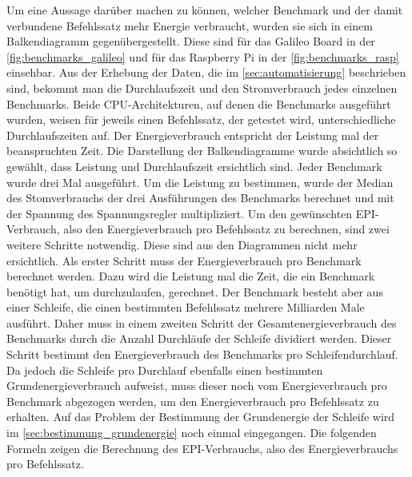 Um eine Aussage darüber machen zu können, welcher Benchmark und der damit verbundene Befehlssatz mehr Energie verbraucht, wurden sie sich in einem Balkendiagramm gegenübergestellt. Diese sind für das Galileo Board in der \autoref{fig:benchmarks_galileo} und für das Raspberry Pi in der \autoref{fig:benchmarks_rasp} einsehbar. Aus der Erhebung der Daten, die im \autoref{sec:automatisierung} beschrieben sind, bekommt man die Durchlaufszeit und den Stromverbrauch jedes einzelnen Benchmarks. Beide CPU-Architekturen, auf denen die Benchmarks ausgeführt wurden, weisen für jeweils einen Befehlssatz, der getestet wird, unterschiedliche Durchlaufszeiten auf. Der Energieverbrauch entspricht der Leistung mal der beanspruchten Zeit. Die Darstellung der Balkendiagramme wurde absichtlich so gewählt, dass Leistung und Durchlaufszeit ersichtlich sind. Jeder Benchmark wurde drei Mal ausgeführt. Um die Leistung zu bestimmen, wurde der Median des Stomverbrauchs der drei Ausführungen des Benchmarks berechnet und mit der Spannung des Spannungsregler multipliziert. Um den gewünschten EPI-Verbrauch, also den Energieverbrauch pro Befehlssatz zu berechnen, sind zwei weitere Schritte notwendig. Diese sind aus den Diagrammen nicht mehr ersichtlich. Als erster Schritt muss der Energieverbrauch pro Benchmark berechnet werden. Dazu wird die Leistung mal die Zeit, die ein Benchmark benötigt hat, um durchzulaufen, gerechnet. Der Benchmark besteht aber aus einer Schleife, die einen bestimmten Befehlssatz mehrere Milliarden Male ausführt. Daher muss in einem zweiten Schritt der Gesamtenergieverbrauch des Benchmarks durch die Anzahl Durchläufe der Schleife dividiert werden. Dieser Schritt bestimmt den Energieverbrauch des Benchmarks pro Schleifendurchlauf. Da jedoch die Schleife pro Durchlauf ebenfalls einen bestimmten Grundenergieverbrauch aufweist, muss dieser noch vom Energieverbrauch pro Benchmark abgezogen werden, um den Energieverbrauch pro Befehlssatz zu erhalten. Auf das Problem der Bestimmung der Grundenergie der Schleife wird im \autoref{sec:bestimmung_grundenergie} noch einmal eingegangen. Die folgenden Formeln zeigen die Berechnung des EPI-Verbrauchs, also des Energieverbrauchs pro Befehlssatz.

\begin{comment}
\[ \textnormal{Leistung} = \textnormal{Median der drei Strommessungen eines Benchmarks} * \textnormal{Spannung} \]

\[\textnormal{EPI-Verbrauch} = \frac{\textnormal{Leistung} * \textnormal{Zeit}}{\textnormal{Anzahl Durchl{\"a}ufe}} - \frac{\textnormal{Grundenergieverbrauch pro Schleifendurchgang}}{\textnormal{Anzahl Durchl{\"a}ufe}}  \]
\end{comment}


